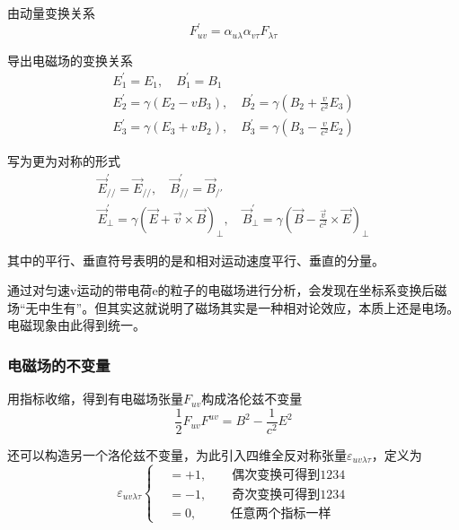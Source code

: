 \documentclass[UTF8]{ctexart}
\begin{document}
    由动量变换关系
    \begin{equation}
        F_{uv}^{\prime} = \alpha_{u\lambda} \alpha_{v\tau} F_{\lambda \tau}
    \end{equation}

\noindent 导出电磁场的变换关系
\begin{equation}
\begin{array}{c}{E_{1}^{\prime}=E_{1}, \quad B_{1}^{\prime}=B_{1}} \\ {E_{2}^{\prime}=\gamma\left(E_{2}-v B_{3}\right), \quad B_{2}^{\prime}=\gamma\left(B_{2}+\frac{v}{c^{2}} E_{3}\right)} \\ {E_{3}^{\prime}=\gamma\left(E_{3}+v B_{2}\right), \quad B_{3}^{\prime}=\gamma\left(B_{3}-\frac{v}{c^{2}} E_{2}\right)}\end{array}
\end{equation}

\noindent 写为更为对称的形式
\begin{equation}
\begin{array}{l}{\vec{E}_{/ /}^{\prime}=\vec{E}_{/ /}, \quad \vec{B}_{/ /}^{\prime}=\vec{B}_{/ \prime}} \\ {\vec{E}_{\perp}^{\prime}=\gamma(\vec{E}+\vec{v} \times \vec{B})_{\perp}, \quad \vec{B}_{\perp}^{\prime}=\gamma\left(\vec{B}-\frac{\vec{v}}{c^{2}} \times \vec{E}\right)_{\perp}}\end{array}
\end{equation}

\noindent 其中的平行、垂直符号表明的是和相对运动速度平行、垂直的分量。

    通过对匀速v运动的带电荷e的粒子的电磁场进行分析，会发现在坐标系变换后磁场“无中生有”。但其实这就说明了磁场其实是一种相对论效应，本质上还是电场。电磁现象由此得到统一。

    \subsubsection{电磁场的不变量}
    用指标收缩，得到有电磁场张量$F_{uv}$构成洛伦兹不变量
    \begin{equation}
        \frac{1}{2} F_{uv} F^{uv} = B^2 - \frac{1}{c^2} E^2\label{equ6.5}
    \end{equation}

\noindent 还可以构造另一个洛伦兹不变量，为此引入四维全反对称张量$\varepsilon_{uv\lambda\tau}$，定义为
\begin{equation}
    \varepsilon_{uv\lambda\tau}  \left \{ \begin{aligned}
        &= +1,\qquad \text{偶次变换可得到1234} \\
        &= -1,\qquad \text{奇次变换可得到1234} \\
        &= 0,\qquad \ \ \ \text{任意两个指标一样} 
    \end{aligned} \right.
\end{equation}
\end{document}
